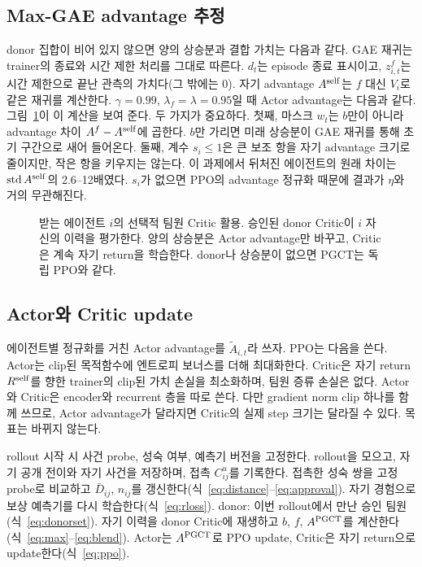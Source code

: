 \documentclass[10pt,twocolumn,letterpaper]{article}
\begin{document}
\subsection{Max-GAE advantage 추정}
donor 집합이 비어 있지 않으면 양의 상승분과 결합 가치는 다음과 같다.
\MaxEquation
GAE 재귀는 trainer의 종료와 시간 제한 처리를 그대로 따른다.
\GAEEquation
$d_t$는 episode 종료 표시이고, $z^f_{i,t}$는 시간 제한으로 끝난 관측의 가치다(그 밖에는 0). 자기 advantage $A^{\rm self}$는 $f$ 대신 $V_i$로 같은 재귀를 계산한다. $\gamma=0.99$, $\lambda_f=\lambda=0.95$일 때 Actor advantage는 다음과 같다.
\BlendEquation
그림~\ref{fig:critic}이 이 계산을 보여 준다. 두 가지가 중요하다. 첫째, 마스크 $w_t$는 $b$만이 아니라 advantage 차이 $A^f-A^{\rm self}$에 곱한다. $b$만 가리면 미래 상승분이 GAE 재귀를 통해 초기 구간으로 새어 들어온다. 둘째, 계수 $s_i\le1$은 큰 보조 항을 자기 advantage 크기로 줄이지만, 작은 항을 키우지는 않는다. 이 과제에서 뒤처진 에이전트의 원래 차이는 $\operatorname{std}A^{\rm self}$의 2.6--12배였다. $s_i$가 없으면 PPO의 advantage 정규화 때문에 결과가 $\eta$와 거의 무관해진다.

\begin{figure}[t]
\centering\resizebox{.97\textwidth}{!}{}
\caption{받는 에이전트 $i$의 선택적 팀원 Critic 활용. 승인된 donor Critic이 $i$ 자신의 이력을 평가한다. 양의 상승분은 Actor advantage만 바꾸고, Critic은 계속 자기 return을 학습한다. donor나 상승분이 없으면 PGCT는 독립 PPO와 같다.}\label{fig:critic}
\end{figure}

\subsection{Actor와 Critic update}
에이전트별 정규화를 거친 Actor advantage를 $\widetilde A_{i,t}$라 쓰자. PPO는 다음을 쓴다.
\PPOEquation
Actor는 clip된 목적함수에 엔트로피 보너스를 더해 최대화한다. Critic은 자기 return $R^{\rm self}$를 향한 trainer의 clip된 가치 손실을 최소화하며, 팀원 증류 손실은 없다. Actor와 Critic은 encoder와 recurrent 층을 따로 쓴다. 다만 gradient norm clip 하나를 함께 쓰므로, Actor advantage가 달라지면 Critic의 실제 step 크기는 달라질 수 있다. 목표는 바뀌지 않는다.

\begin{algorithm}[tb]
\caption{에이전트 $i$의 PGCT update 한 번}
\label{alg:pgct}
\begin{algorithmic}[1]
\STATE rollout 시작 시 사건 probe, 성숙 여부, 예측기 버전을 고정한다.
\STATE rollout을 모으고, 자기 공개 전이와 자기 사건을 저장하며, 접촉 $C^u_{ij}$를 기록한다.
\STATE 접촉한 성숙 쌍을 고정 probe로 비교하고 $\bar D_{ij}$, $n_{ij}$를 갱신한다(식~\ref{eq:distance}--\ref{eq:approval}).
\STATE 자기 경험으로 보상 예측기를 다시 학습한다(식~\ref{eq:rloss}).
\ENDIF
\STATE donor: 이번 rollout에서 만난 승인 팀원(식~\ref{eq:donorset}).
\STATE 자기 이력을 donor Critic에 재생하고 $b$, $f$, $A^{\rm PGCT}$를 계산한다(식~\ref{eq:max}--\ref{eq:blend}).
\STATE Actor는 $A^{\rm PGCT}$로 PPO update, Critic은 자기 return으로 update한다(식~\ref{eq:ppo}).
\end{algorithmic}
\end{algorithm}
\end{document}
